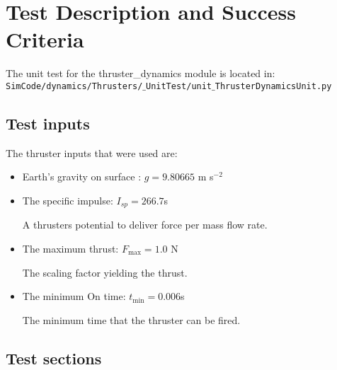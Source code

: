 \section{Test Description and Success Criteria}

The unit test for the thruster\_dynamics module is located in:\\

\noindent
{\tt SimCode/dynamics/Thrusters/$\_$UnitTest/unit$\_$ThrusterDynamicsUnit.py} \\

\subsection{Test inputs}

The thruster inputs that were used are:

\begin{itemize}
\item Earth's gravity on surface : $g=9.80665$ m s$^{-2}$ 
\item The specific impulse: $I_{sp} = 266.7$s 

A thrusters potential to deliver force per mass flow rate. 
\item The maximum thrust: $F_{\mathrm{max}} = 1.0$ N

The scaling factor yielding the thrust.
\item The minimum On time: $t_{\mathrm{min}} = 0.006$s

The minimum time that the thruster can be fired.
\end{itemize}

\subsection{Test sections}

